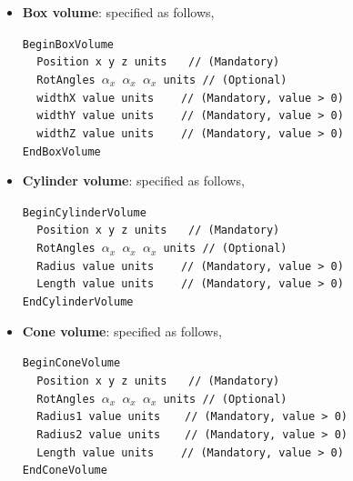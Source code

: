 \begin{itemize}
  \item  {\bf Box volume}: specified as follows,

  \noindent
  {\tt BeginBoxVolume} \\
  $~~~~~${\tt Position   x  y  z  units                       $~~~$ // (Mandatory)} \\
  $~~~~~${\tt RotAngles  $\alpha_x$  $\alpha_x$  $\alpha_x$  units  // (Optional)} \\
  $~~~~~${\tt widthX     value   units                      $~~~~~$ // (Mandatory, value > 0)} \\
  $~~~~~${\tt widthY     value   units                      $~~~~~$ // (Mandatory, value > 0)} \\
  $~~~~~${\tt widthZ     value   units                      $~~~~~$ // (Mandatory, value > 0)} \\
  {\tt EndBoxVolume}
  
  \item {\bf Cylinder volume}: specified as follows,
  
  \noindent
  {\tt BeginCylinderVolume} \\
  $~~~~~${\tt Position   x  y  z  units                       $~~~$ // (Mandatory)} \\
  $~~~~~${\tt RotAngles  $\alpha_x$  $\alpha_x$  $\alpha_x$  units  // (Optional)} \\
  $~~~~~${\tt Radius     value   units                      $~~~~~$ // (Mandatory, value > 0)} \\
  $~~~~~${\tt Length     value   units                      $~~~~~$ // (Mandatory, value > 0)} \\
  {\tt EndCylinderVolume}
  
  \item {\bf Cone volume}: specified as follows,
  
  \noindent
  {\tt BeginConeVolume} \\
  $~~~~~${\tt Position   x  y  z  units                       $~~~$ // (Mandatory)} \\
  $~~~~~${\tt RotAngles  $\alpha_x$  $\alpha_x$  $\alpha_x$  units  // (Optional)} \\
  $~~~~~${\tt Radius1    value   units                       $~~~~$ // (Mandatory, value > 0)} \\
  $~~~~~${\tt Radius2    value   units                       $~~~~$ // (Mandatory, value > 0)} \\
  $~~~~~${\tt Length     value   units                      $~~~~~$ // (Mandatory, value > 0)} \\
  {\tt EndConeVolume}
  

\end{itemize}
